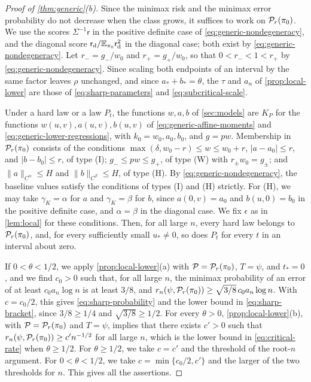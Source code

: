\begin{proof}[Proof of \cref{thm:generic}(b)]
Since the minimax risk and the minimax error probability do not
decrease when the class grows, it suffices to work on $\mathcal P_r(\pi_0)$.
We use the scores $\Sigma^{-1}\mathsf r$ in the positive definite case
of \eqref{eq:generic-nondegeneracy}, and the diagonal score
$\mathsf r_{\rm d}/\mathbb E_{\pi_0}\mathsf r_{\rm d}^2$ in the diagonal case;
both exist by \eqref{eq:generic-nondegeneracy}. Let $r_-=g_-/w_0$ and
$r_+=g_+/w_0$, so that $0<r_-<1<r_+$ by
\eqref{eq:generic-nondegeneracy}. Since scaling both endpoints of an
interval by the same factor leaves $\rho$ unchanged, and since
$a_*+b_*=\theta$, the $\tau$ and $a_n$ of \cref{prop:local-lower} are those of
\eqref{eq:sharp-parameters} and \eqref{eq:subcritical-scale}.

Under a hard law or a law $P_t$, the functions $w,a,b$ of
\cref{sec:models} are $K_P$ for the functions
$w(u,v),a(u,v),b(u,v)$ of \eqref{eq:generic-affine-moments} and
\eqref{eq:generic-lower-regressions}, with $k_0=w_0,a_0,b_0$, and
$g=pw$. Membership in $\mathcal P_r(\pi_0)$ consists of the conditions
$\max(\delta,w_0-r)\le w\le w_0+r$, $|a-a_0|\le r$, and
$|b-b_0|\le r$, of type (I); $g_-\le pw\le g_+$, of type (W) with
$r_\pm w_0=g_\pm$; and $\|a\|_{C^\alpha}\le H$ and
$\|b\|_{C^\beta}\le H$, of type (H). By
\eqref{eq:generic-nondegeneracy}, the baseline values satisfy the
conditions of types (I) and (H) strictly. For (H), we may take
$\gamma_K=\alpha$ for $a$ and $\gamma_K=\beta$ for $b$, since
$a(0,v)=a_0$ and $b(u,0)=b_0$ in the positive definite case, and
$\alpha=\beta$ in the diagonal case. We fix $\epsilon$ as in
\cref{lem:local} for these conditions. Then, for all large $n$,
every hard law belongs to $\mathcal P_r(\pi_0)$, and, for every sufficiently
small $u_*\ne0$, so does $P_t$ for every $t$ in an interval about zero.

If $0<\theta<1/2$, we apply \cref{prop:local-lower}(a) with
$\mathcal P=\mathcal P_r(\pi_0)$, $T=\psi$, and $t_*=0$, and we find $c_0>0$
such that, for all large $n$, the minimax probability of an error of at least
$c_0a_n\log n$ is at least $3/8$, and
$r_n(\psi,\mathcal P_r(\pi_0))\ge\sqrt{3/8}\,c_0a_n\log n$. With $c=c_0/2$,
this gives \eqref{eq:sharp-probability} and the lower bound in
\eqref{eq:sharp-bracket}, since $3/8\ge1/4$ and $\sqrt{3/8}\ge1/2$. For
every $\theta>0$, \cref{prop:local-lower}(b), with
$\mathcal P=\mathcal P_r(\pi_0)$ and $T=\psi$, implies that there exists
$c'>0$ such that
$r_n(\psi,\mathcal P_r(\pi_0))\ge c'n^{-1/2}$ for all large $n$, which is the
lower bound in \eqref{eq:critical-rate} when $\theta\ge1/2$. For $\theta\ge1/2$, we take $c=c'$ and the threshold of the
root-$n$ argument. For $0<\theta<1/2$, we take $c=\min\{c_0/2,c'\}$ and
the larger of the two thresholds for $n$. This gives all the
assertions.
\end{proof}

